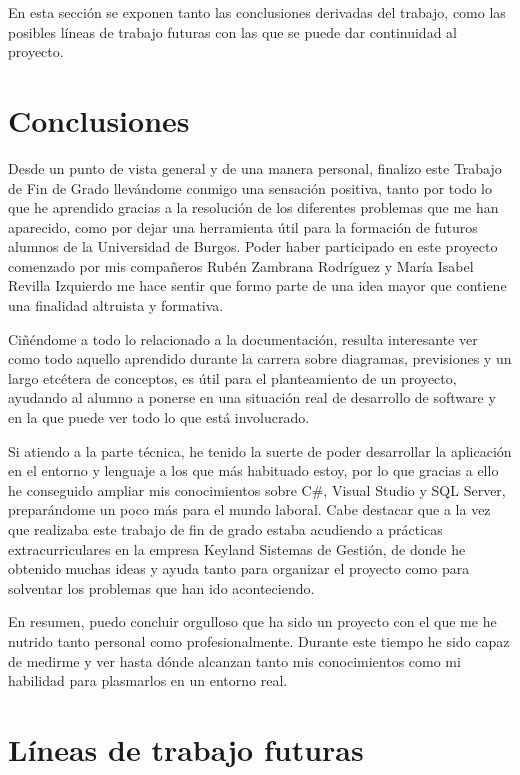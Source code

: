 
En esta sección se exponen tanto las conclusiones derivadas del trabajo, como las posibles líneas de trabajo futuras con las que se puede dar continuidad al proyecto. 

\section{Conclusiones}

Desde un punto de vista general y de una manera personal, finalizo este Trabajo de Fin de Grado llevándome conmigo una sensación positiva, tanto por todo lo que he aprendido gracias a la resolución de los diferentes problemas que me han aparecido, como por dejar una herramienta útil  para la formación de futuros alumnos de la Universidad de Burgos. Poder haber participado en este proyecto comenzado por mis compañeros Rubén Zambrana Rodríguez y María Isabel Revilla Izquierdo me hace sentir que formo parte de una idea mayor que contiene una finalidad altruista y formativa.

Ciñéndome a todo lo relacionado a la documentación, resulta interesante ver como todo aquello aprendido durante la carrera sobre diagramas, previsiones y un largo etcétera de conceptos, es útil para el planteamiento de un proyecto, ayudando al alumno a ponerse en una situación real de desarrollo de software y en la que puede ver todo lo que está involucrado.

Si atiendo a la parte técnica, he tenido la suerte de poder desarrollar la aplicación en el entorno y lenguaje a los que más habituado estoy, por lo que gracias a ello he conseguido ampliar mis conocimientos sobre C\#, Visual Studio y SQL Server, preparándome un poco más para el mundo laboral. Cabe destacar que a la vez que realizaba este trabajo de fin de grado estaba acudiendo a prácticas extracurriculares en la empresa Keyland Sistemas de Gestión, de donde he obtenido muchas ideas y ayuda tanto para organizar el proyecto como para solventar los problemas que han ido aconteciendo.

En resumen, puedo concluir orgulloso que ha sido un proyecto con el que me he nutrido tanto personal como profesionalmente. Durante este tiempo he sido capaz de medirme y ver hasta dónde alcanzan tanto mis conocimientos como mi habilidad para plasmarlos en un entorno real.

\section{Líneas de trabajo futuras}

